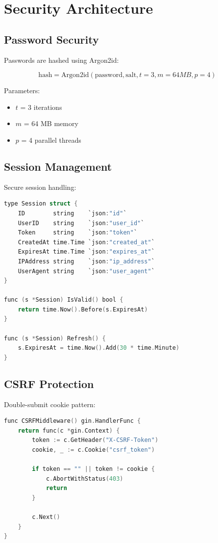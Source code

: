 \section{Security Architecture}


\subsection{Password Security}

Passwords are hashed using Argon2id:

\begin{equation}
    \text{hash} = \text{Argon2id}(\text{password}, \text{salt}, t=3, m=64MB, p=4)
\end{equation}

Parameters:
\begin{itemize}
    \item $t$ = 3 iterations
    \item $m$ = 64 MB memory
    \item $p$ = 4 parallel threads
\end{itemize}

\subsection{Session Management}

Secure session handling:

\begin{lstlisting}[language=C]
type Session struct {
    ID        string    `json:"id"`
    UserID    string    `json:"user_id"`
    Token     string    `json:"token"`
    CreatedAt time.Time `json:"created_at"`
    ExpiresAt time.Time `json:"expires_at"`
    IPAddress string    `json:"ip_address"`
    UserAgent string    `json:"user_agent"`
}

func (s *Session) IsValid() bool {
    return time.Now().Before(s.ExpiresAt)
}

func (s *Session) Refresh() {
    s.ExpiresAt = time.Now().Add(30 * time.Minute)
}
\end{lstlisting}

\subsection{CSRF Protection}

Double-submit cookie pattern:

\begin{lstlisting}[language=C]
func CSRFMiddleware() gin.HandlerFunc {
    return func(c *gin.Context) {
        token := c.GetHeader("X-CSRF-Token")
        cookie, _ := c.Cookie("csrf_token")

        if token == "" || token != cookie {
            c.AbortWithStatus(403)
            return
        }

        c.Next()
    }
}
\end{lstlisting}

